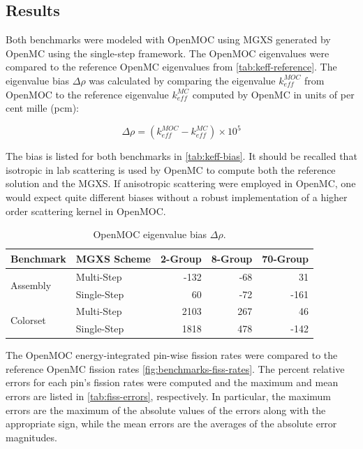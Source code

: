 \subsection{Results}
\label{subsec:results}

Both benchmarks were modeled with OpenMOC using MGXS generated by OpenMC using the single-step framework. The OpenMOC eigenvalues were compared to the reference OpenMC eigenvalues from \autoref{tab:keff-reference}. The eigenvalue bias $\Delta\rho$ was calculated by comparing the eigenvalue $k_{eff}^{MOC}$ from OpenMOC to the reference eigenvalue $k_{eff}^{MC}$ computed by OpenMC in units of per cent mille (pcm):

\begin{equation}
\label{eqn:delta-rho}
\Delta\rho = \left(k_{eff}^{MOC} - k_{eff}^{MC}\right) \times 10^{5}
\end{equation}

The bias is listed for both benchmarks in \autoref{tab:keff-bias}. It should be recalled that isotropic in lab scattering is used by OpenMC to compute both the reference solution and the MGXS. If anisotropic scattering were employed in OpenMC, one would expect quite different biases without a robust implementation of a higher order scattering kernel in OpenMOC.

\begin{table}[h!]
  \centering
  \caption{OpenMOC eigenvalue bias $\Delta\rho$.}
  \label{tab:keff-bias} 
  \begin{tabular}{l l r r r}
  \toprule
  \textbf{Benchmark} & \textbf{MGXS Scheme} & \textbf{2-Group} & \textbf{8-Group} & \textbf{70-Group} \\
  \midrule
  \multirow{2}{*}{Assembly} & Multi-Step    & -132 & -68 &   31 \\
                            & Single-Step &   60 & -72 & -161 \\
  \midrule
  \multirow{2}{*}{Colorset} & Multi-Step    & 2103 & 267 &   46 \\
                            & Single-Step & 1818 & 478 & -142 \\
  \bottomrule
\end{tabular}
\end{table}

The OpenMOC energy-integrated pin-wise fission rates were compared to the reference OpenMC fission rates \autoref{fig:benchmarks-fiss-rates}. The percent relative errors for each pin's fission rates were computed and the maximum and mean errors are listed in \autoref{tab:fiss-errors}, respectively. In particular, the maximum errors are the maximum of the absolute values of the errors along with the appropriate sign, while the mean errors are the averages of the absolute error magnitudes.

